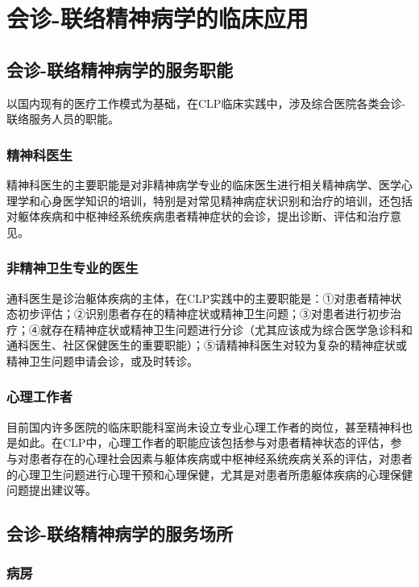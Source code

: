 \section{会诊-联络精神病学的临床应用}

\subsection{会诊-联络精神病学的服务职能}

以国内现有的医疗工作模式为基础，在CLP临床实践中，涉及综合医院各类会诊-联络服务人员的职能。

\subsubsection{精神科医生}

精神科医生的主要职能是对非精神病学专业的临床医生进行相关精神病学、医学心理学和心身医学知识的培训，特别是对常见精神病症状识别和治疗的培训，还包括对躯体疾病和中枢神经系统疾病患者精神症状的会诊，提出诊断、评估和治疗意见。

\subsubsection{非精神卫生专业的医生}

通科医生是诊治躯体疾病的主体，在CLP实践中的主要职能是：①对患者精神状态初步评估；②识别患者存在的精神症状或精神卫生问题；③对患者进行初步治疗；④就存在精神症状或精神卫生问题进行分诊（尤其应该成为综合医学急诊科和通科医生、社区保健医生的重要职能）；⑤请精神科医生对较为复杂的精神症状或精神卫生问题申请会诊，或及时转诊。

\subsubsection{心理工作者}

目前国内许多医院的临床职能科室尚未设立专业心理工作者的岗位，甚至精神科也是如此。在CLP中，心理工作者的职能应该包括参与对患者精神状态的评估，参与对患者存在的心理社会因素与躯体疾病或中枢神经系统疾病关系的评估，对患者的心理卫生问题进行心理干预和心理保健，尤其是对患者所患躯体疾病的心理保健问题提出建议等。

\subsection{会诊-联络精神病学的服务场所}

\subsubsection{病房}

